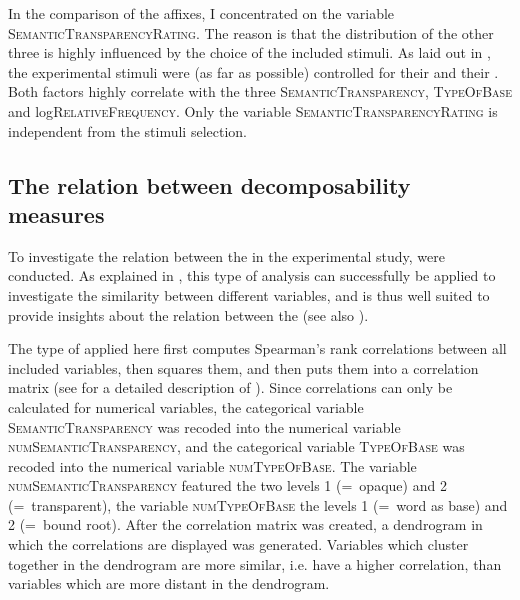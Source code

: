 In the  comparison of the affixes, I concentrated on the variable \textsc{SemanticTransparencyRating}. The reason is that the distribution of the other three  is highly influenced by the choice of the included stimuli. 
 As laid out in , the experimental stimuli were (as far as possible) controlled for their   and their . Both factors highly correlate with the three   \textsc{SemanticTransparency}, \textsc{TypeOfBase} and log\textsc{RelativeFrequency}. 
 Only the variable \textsc{SemanticTransparencyRating} is independent from the stimuli selection.



\subsection{The relation between decomposability measures}

To investigate the relation between the  in the experimental study,  were conducted. As  explained in , this type of analysis can successfully be applied to investigate the similarity between different variables, and is thus well suited to provide insights about the relation between the  (see also \citealt[200 f.]{Baayen.2008}). 

The type of  applied here first computes Spearman's rank correlations between all included variables, then squares them, and then puts them into a correlation matrix  (see  for a detailed description of ). 
Since correlations can only be calculated for numerical variables, 
the categorical variable \textsc{SemanticTransparency}  was recoded into the numerical variable \textsc{numSemanticTransparency}, and the categorical variable \textsc{TypeOfBase} was recoded into the numerical variable \textsc{numTypeOfBase}.  The variable \textsc{numSemanticTransparency} featured  the two levels 1 (=~opaque) and 2 (=~transparent), the variable \textsc{numTypeOfBase} the levels 1 (=~word as base) and 2 (=~bound root). After the correlation matrix was created,  a dendrogram in which the correlations are displayed was generated. Variables which cluster together in the dendrogram are more similar, i.e. have a higher correlation, than variables which are more distant in the dendrogram. 


